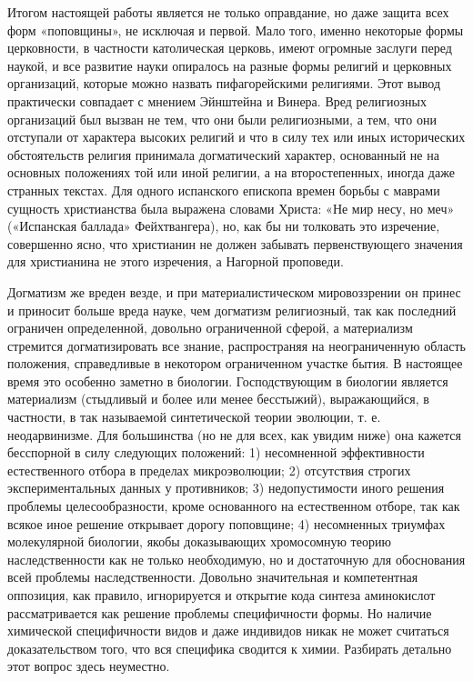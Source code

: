 Итогом настоящей работы является не  только оправдание, но даже защита
всех  форм  «поповщины»,  не  исключая и  первой.  Мало  того,  именно
некоторые формы  церковности, в частности католическая  церковь, имеют
огромные  заслуги перед  наукой,  и все  развитие  науки опиралось  на
разные формы  религий и  церковных организаций, которые  можно назвать
пифагорейскими религиями.  Этот вывод практически совпадает  с мнением
Эйнштейна и  Винера. Вред религиозных  организаций был вызван  не тем,
что  они были  религиозными, а  тем,  что они  отступали от  характера
высоких религий и  что в силу тех или  иных исторических обстоятельств
религия принимала  догматический характер,  основанный не  на основных
положениях  той или  иной религии,  а на  второстепенных, иногда  даже
странных  текстах.  Для одного  испанского  епископа  времен борьбы  с
маврами сущность  христианства была  выражена словами Христа:  «Не мир
несу,  но  меч» («Испанская  баллада»  Фейхтвангера),  но, как  бы  ни
толковать  это изречение,  совершенно ясно,  что христианин  не должен
забывать первенствующего значения для  христианина не этого изречения,
а Нагорной проповеди.

Догматизм же  вреден везде, и при  материалистическом мировоззрении он
принес и приносит  больше вреда науке, чем  догматизм религиозный, так
как  последний ограничен  определенной, довольно  ограниченной сферой,
а  материализм  стремится  догматизировать все  знание,  распространяя
на   неограниченную  область   положения,  справедливые   в  некотором
ограниченном участке бытия.  В настоящее время это  особенно заметно в
биологии.  Господствующим в  биологии является  материализм (стыдливый
и  более  или  менее  бесстыжий), выражающийся,  в  частности,  в  так
называемой  синтетической   теории  эволюции,  т.   е.  неодарвинизме.
Для  большинства  (но  не  для  всех, как  увидим  ниже)  она  кажется
бесспорной в  силу следующих  положений: 1)  несомненной эффективности
естественного отбора  в пределах микроэволюции; 2)  отсутствия строгих
экспериментальных  данных  у   противников;  3)  недопустимости  иного
решения проблемы  целесообразности, кроме основанного  на естественном
отборе,  так  как  всякое  иное решение  открывает  дорогу  поповщине;
4)  несомненных  триумфах  молекулярной биологии,  якобы  доказывающих
хромосомную теорию  наследственности как  не только необходимую,  но и
достаточную для  обоснования всей проблемы  наследственности. Довольно
значительная  и компетентная  оппозиция, как  правило, игнорируется  и
открытие кода синтеза аминокислот рассматривается как решение проблемы
специфичности формы. Но наличие  химической специфичности видов и даже
индивидов  никак  не может  считаться  доказательством  того, что  вся
специфика  сводится  к химии.  Разбирать  детально  этот вопрос  здесь
неуместно.

